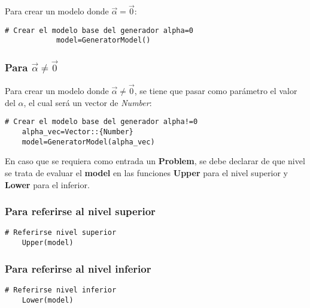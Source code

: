 Para crear un modelo donde $\vec{\alpha}=\vec{0}$:
   
        \begin{lstlisting}[caption={Crear el modelo para $\vec{\alpha}=\vec{0}$}]
            # Crear el modelo base del generador alpha=0
            model=GeneratorModel()
        \end{lstlisting}
        
    
  
%
\subsubsection{Para $\vec{\alpha} \neq \vec{0}$ }

Para crear un modelo donde $\vec{\alpha}\neq \vec{0}$,
se tiene que pasar como parámetro el valor del $\alpha$,
el cual será un vector de \textit{Number}:

\begin{lstlisting}[caption={Crear el modelo para $\vec{\alpha } \neq \vec{0}$}]
    # Crear el modelo base del generador alpha!=0
    alpha_vec=Vector::{Number}
    model=GeneratorModel(alpha_vec)
\end{lstlisting}
%



En caso que se requiera como entrada un \textbf{Problem}, se debe declarar
de que nivel se trata de evaluar el \textbf{model} en las funciones \textbf{Upper} para el nivel 
superior y \textbf{Lower} para el inferior.

\subsubsection{Para referirse al nivel superior}
\begin{lstlisting}[caption={Referirse al nivel superior}]
    # Referirse nivel superior
    Upper(model)
\end{lstlisting}
\subsubsection{Para referirse al nivel inferior}
\begin{lstlisting}[caption={Referirse al nivel inferior}]
    # Referirse nivel inferior
    Lower(model)
\end{lstlisting}


